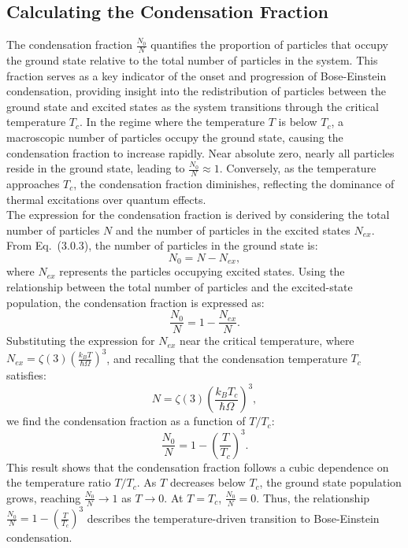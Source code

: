 \documentclass{article}
\numberwithin{equation}{section}
\numberwithin{equation}{subsection}
\begin{document}
\subsection{Calculating the Condensation Fraction}
The condensation fraction \( \frac{N_0}{N} \) quantifies the proportion of particles that occupy the ground state relative to the total number of particles in the system. This fraction serves as a key indicator of the onset and progression of Bose-Einstein condensation, providing insight into the redistribution of particles between the ground state and excited states as the system transitions through the critical temperature \( T_c \).
In the regime where the temperature \( T \) is below \( T_c \), a macroscopic number of particles occupy the ground state, causing the condensation fraction to increase rapidly. Near absolute zero, nearly all particles reside in the ground state, leading to \( \frac{N_0}{N} \approx 1 \). Conversely, as the temperature approaches \( T_c \), the condensation fraction diminishes, reflecting the dominance of thermal excitations over quantum effects.\\
The expression for the condensation fraction is derived by considering the total number of particles \( N \) and the number of particles in the excited states \( N_{ex} \). From Eq.~(3.0.3), the number of particles in the ground state is:
\[
N_0 = N - N_{ex},
\]
where \( N_{ex} \) represents the particles occupying excited states. Using the relationship between the total number of particles and the excited-state population, the condensation fraction is expressed as:
\[
\frac{N_0}{N} = 1 - \frac{N_{ex}}{N}.
\]
Substituting the expression for \( N_{ex} \) near the critical temperature, where \( N_{ex} = \zeta(3) \left( \frac{k_B T}{\hbar \Omega} \right)^3 \), and recalling that the condensation temperature \( T_c \) satisfies:
\[
N = \zeta(3) \left( \frac{k_B T_c}{\hbar \Omega} \right)^3,
\]
we find the condensation fraction as a function of \( T/T_c \):
\begin{equation}
    \frac{N_0}{N} = 1 - \left(\frac{T}{T_c}\right)^3.
\end{equation}
This result shows that the condensation fraction follows a cubic dependence on the temperature ratio \( T/T_c \). As \( T \) decreases below \( T_c \), the ground state population grows, reaching \( \frac{N_0}{N} \to 1 \) as \( T \to 0 \). At \( T = T_c \), \( \frac{N_0}{N} = 0 \). Thus, the relationship \( \frac{N_0}{N} = 1 - \left(\frac{T}{T_c}\right)^3 \) describes the temperature-driven transition to Bose-Einstein condensation.
\end{document}
